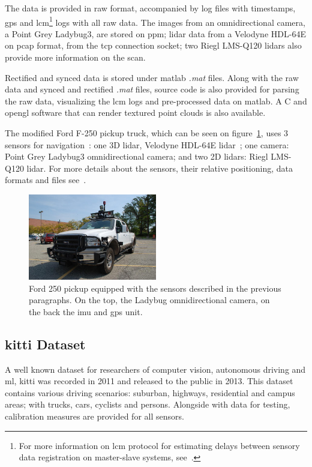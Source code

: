 The data is provided in raw format, accompanied by log files with timestamps, \ac{gps} and \ac{lcm}\footnote{For more information on \acf{lcm} protocol for estimating delays between sensory data registration on master-slave systems, see~\cite{VelodyneHDL64}.} logs with all raw data. The images from an omnidirectional camera, a Point Grey Ladybug3, are stored on \ac{ppm}; \ac{lidar} data from a Velodyne HDL-64E on \ac{pcap} format, from the \ac{tcp} connection socket; two Riegl LMS-Q120 \acp{lidar} also provide more information on the scan.

Rectified and synced data is stored under \ac{matlab} \textit{.mat} files. Along with the raw data and synced and rectified \textit{.mat} files, source code is also provided for parsing the raw data, visualizing the \ac{lcm} logs and pre-processed data on \ac{matlab}. A C and \ac{opengl} software that can render textured point clouds is also available.

The modified Ford F-250 pickup truck, which can be seen on figure~\ref{fig:sota:ford_sensors}, uses 3 sensors for navigation~\cite{Pandey2011}: one 3D \ac{lidar}, Velodyne HDL-64E \ac{lidar}~\cite{VelodyneHDL64}; one camera: Point Grey Ladybug3 omnidirectional camera; and two 2D \acp{lidar}: Riegl LMS-Q120 lidar. For more details about the sensors, their relative positioning, data formats and files see~\cite{Pandey2011}.

\begin{figure}
	\centering
	\includegraphics[width=0.5\textwidth]{img/sensor_fusion/ford_sensors.jpg}
	\caption{Ford 250 pickup equipped with the sensors described in the previous paragraphs. On the top, the Ladybug omnidirectional camera, on the back the \ac{imu} and \ac{gps} unit.}
	\label{fig:sota:ford_sensors}
\end{figure}


\subsection{\acl{kitti} Dataset}
A well known dataset for researchers of computer vision, autonomous driving and \ac{ml}, \ac{kitti} was recorded in 2011 and released to the public in 2013. This dataset contains various driving scenarios: suburban, highways, residential and campus areas; with trucks, cars, cyclists and persons. Alongside with data for testing, calibration measures are provided for all sensors.


